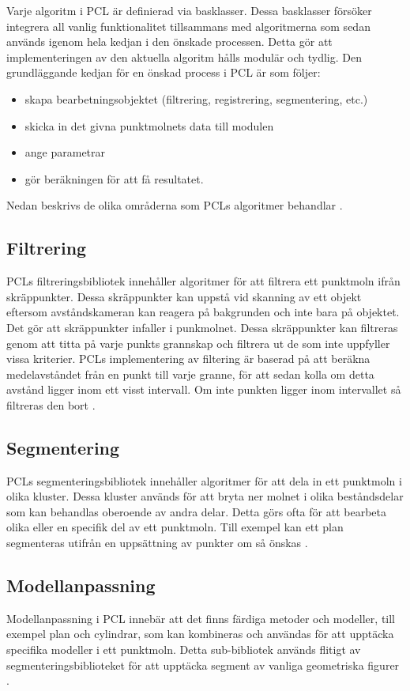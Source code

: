Varje algoritm i PCL är definierad via basklasser. Dessa basklasser försöker integrera all vanlig funktionalitet tillsammans med algoritmerna som sedan används igenom hela kedjan i den önskade processen. Detta gör att implementeringen av den aktuella algoritm hålls modulär och tydlig. Den grundläggande kedjan för en önskad process i PCL är som följer:

\begin{itemize}
	\item skapa bearbetningsobjektet (filtrering, registrering, segmentering, etc.)
	\item skicka in det givna punktmolnets data till modulen
	\item ange parametrar
	\item gör beräkningen för att få resultatet.
\end{itemize}
Nedan beskrivs de olika områderna som PCLs algoritmer behandlar \cite{rusu20113d}.

\subsection{Filtrering}
PCLs filtreringsbibliotek innehåller algoritmer för att filtrera ett punktmoln ifrån skräppunkter. Dessa skräppunkter kan uppstå vid skanning av ett objekt eftersom avståndskameran kan reagera på bakgrunden och inte bara på objektet. Det gör att skräppunkter infaller i punkmolnet. Dessa skräppunkter kan filtreras genom att titta på varje punkts grannskap och filtrera ut de som inte uppfyller vissa kriterier. PCLs implementering av filtering är baserad på att beräkna medelavståndet från en punkt till varje granne, för att sedan kolla om detta avstånd ligger inom ett visst intervall. Om inte punkten ligger inom intervallet så filtreras den bort \cite{pcl_filtering}. 
 
\subsection{Segmentering}
PCLs segmenteringsbibliotek innehåller algoritmer för att dela in ett punktmoln i olika kluster. Dessa kluster används för att bryta ner molnet i olika beståndsdelar som kan behandlas oberoende av andra delar. Detta görs ofta för att bearbeta olika eller en specifik del av ett punktmoln. Till exempel kan ett plan segmenteras utifrån en uppsättning av punkter om så önskas \cite{pcl_segmentation}. 
 
\subsection{Modellanpassning}
Modellanpassning i PCL innebär att det finns färdiga metoder och modeller, till exempel plan och cylindrar, som kan kombineras och användas för att upptäcka specifika modeller i ett punktmoln. Detta sub-bibliotek används flitigt av segmenteringsbiblioteket för att upptäcka segment av vanliga geometriska figurer \cite{pcl_model_fitting}.

